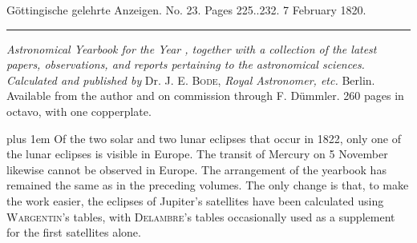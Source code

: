 \clearpage
{}
\hypertarget{native-624-lower}{}
\begin{center}\small Göttingische gelehrte Anzeigen. No. 23. Pages 225..232. 7 February 1820.\\[3pt]\rule{.72\linewidth}{.3pt}\end{center}

\emph{Astronomical Yearbook for the Year {}, together with a collection of the latest papers, observations, and reports pertaining to the astronomical sciences. Calculated and published by} Dr. J. E. \textsc{Bode}, \emph{Royal Astronomer, etc.} Berlin. Available from the author and on commission through F. Dümmler. 260 pages in octavo, with one copperplate.

\begingroup\rightskip=0pt plus 1em
Of the two solar and two lunar eclipses that occur in 1822, only one of the lunar eclipses is visible in Europe. The transit of Mercury on 5 November likewise cannot be observed in Europe. The arrangement of the yearbook has remained the same as in the preceding volumes. The only change is that, to make the work easier, the eclipses of Jupiter's satellites have been calculated using \textsc{Wargentin}'s tables, with \textsc{Delambre}'s tables occasionally used as a supplement for the first satellites alone.\par\endgroup

